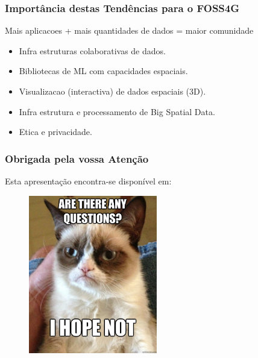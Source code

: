 \documentclass[hyperref={pdfpagelabels=true}]{beamer}
\begin{document}
\begin{frame}
\frametitle{Import\^{a}ncia destas Tend\^{e}ncias para o FOSS4G}

    Mais aplicacoes + mais quantidades de dados = maior comunidade%
    \begin{itemize}
        \item<2->Infra estruturas colaborativas de dados.
        \item<3->Bibliotecas de ML com capacidades espaciais.
        \item<4->Visualizacao (interactiva) de dados espaciais (3D).
        \item<5->Infra estrutura e processamento de Big Spatial Data.
        \item<6->Etica e privacidade.%
    \end{itemize}                      

\end{frame}


\begin{frame}
\frametitle{Obrigada pela vossa Aten\c{c}\~{a}o}
    Esta apresenta\c{c}\~{a}o encontra-se dispon\'{i}vel em: 
    \begin{figure}   
      \includegraphics[width=0.5\textwidth]{cat.jpg}      
    \end{figure}   
    
\end{frame}


\end{document}

